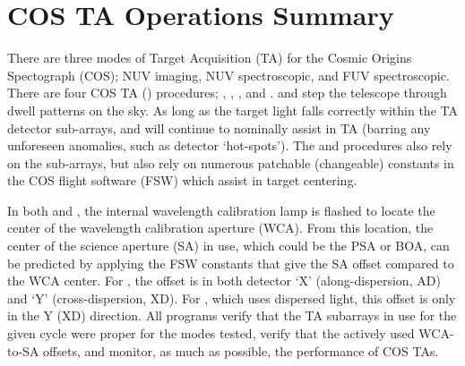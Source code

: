\section{COS TA Operations Summary}\label{sec:TAoperations}

There are three modes of Target Acquisition (TA) for the Cosmic Origins Spectograph (COS); NUV imaging, NUV spectroscopic, and FUV spectroscopic.
There are four COS TA (\tacq{}) procedures; , , , and .
 and  step the telescope through dwell patterns on the sky.
As long as the target light falls correctly within the TA detector sub-arrays,  and  will continue to nominally assist in TA (barring any unforeseen anomalies, such as detector `hot-spots').
The  and  procedures also rely on the sub-arrays, but also rely on numerous patchable (changeable) constants
in the COS flight software (FSW) which assist in target centering.

In both  and , the internal wavelength calibration lamp is flashed to locate the center of the wavelength calibration aperture (WCA).
From this location, the center of the science aperture (SA) in use, which could be the PSA or BOA, can be predicted by applying the FSW constants that give the SA offset compared to the WCA center. For ,
the offset is in both detector `X' (along-dispersion, AD) and `Y' (cross-dispersion, XD).
For , which uses dispersed light, this offset is only in the Y (XD) direction.
All programs verify that the TA subarrays in use for the given cycle were proper for the \tacq modes tested, verify that the actively used WCA-to-SA offsets, and monitor, as much as possible, the performance of COS TAs.

